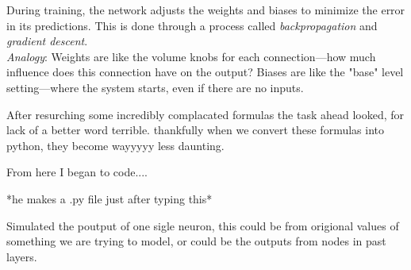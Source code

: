 \documentclass[12pt]{article}
\begin{document}
\begin{enumerate}
    During training, the network adjusts the weights and biases to minimize the error in its predictions. This is done through a process called \textit{backpropagation} and \textit{gradient descent}. \\
    \textit{Analogy}: Weights are like the volume knobs for each connection—how much influence does this connection have on the output? Biases are like the "base" level setting—where the system starts, even if there are no inputs.
\end{enumerate}

After resurching some incredibly complacated formulas the task ahead looked, for lack of a better word terrible. thankfully when we convert these formulas into python, they become wayyyyy less daunting.

From here I began to code....

*he makes a .py file just after typing this*

Simulated the poutput of one sigle neuron, this could be from origional values of something we are trying to model, or could be the outputs from nodes in past layers. 
\end{document}
